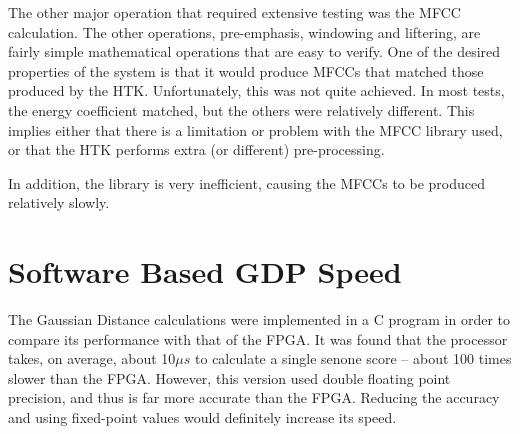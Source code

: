 	The other major operation that required extensive testing was the MFCC calculation.  The other operations, pre-emphasis, windowing and liftering, are fairly simple mathematical operations that are easy to verify.  One of the desired properties of the system is that it would produce MFCCs that matched those produced by the HTK. Unfortunately, this was not quite achieved.  In most tests, the energy coefficient matched, but the others were relatively different.  This implies either that there is a limitation or problem with the MFCC library used, or that the HTK performs extra (or different) pre-processing.

	In addition, the library is very inefficient, causing the MFCCs to be produced relatively slowly.

\section{Software Based GDP Speed} %
\label{sec:software_based_gdp_speed_testing}
	The Gaussian Distance calculations were implemented in a C program in order to compare its performance with that of the FPGA.  It was found that the processor takes, on average, about 10$\mu s$ to calculate a single senone score -- about 100 times slower than the FPGA.  However, this version used double floating point precision, and thus is far more accurate than the FPGA.  Reducing the accuracy and using fixed-point values would definitely increase its speed.  %




% 


